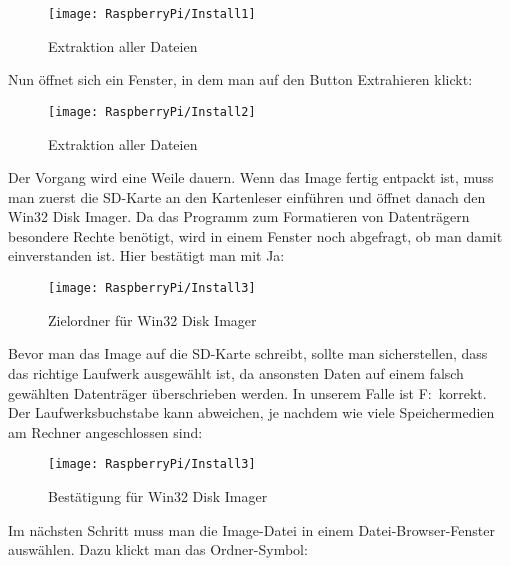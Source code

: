 \begin{figure}[!h]
	\centering

    \texttt{[image: RaspberryPi/Install1]}
	
	\caption{Extraktion aller Dateien}
	
\end{figure}

Nun öffnet sich ein Fenster, in dem man auf den Button Extrahieren klickt:

\begin{figure}[!h]
	\centering
	
 	\texttt{[image: RaspberryPi/Install2]}
	
	\caption{Extraktion aller Dateien}
	
\end{figure}




Der Vorgang wird eine Weile dauern. Wenn das Image fertig entpackt ist, muss man zuerst die SD-Karte an den Kartenleser einführen und öffnet danach den Win32 Disk Imager. Da das Programm zum Formatieren von Datenträgern besondere Rechte benötigt, wird in einem Fenster noch abgefragt, ob man damit einverstanden ist. Hier bestätigt man mit Ja:

\begin{figure}[!h]
	\centering
	
	\texttt{[image: RaspberryPi/Install3]}
	
	\caption{Zielordner für Win32 Disk Imager}
	
\end{figure}

Bevor man das Image auf die SD-Karte schreibt, sollte man sicherstellen, dass das richtige Laufwerk ausgewählt ist, da ansonsten Daten auf einem falsch gewählten Datenträger überschrieben werden. In unserem Falle ist F:\ korrekt. Der Laufwerksbuchstabe kann abweichen, je nachdem wie viele Speichermedien am Rechner angeschlossen sind:


\begin{figure}[!h]
	\centering
	
	\texttt{[image: RaspberryPi/Install3]}
	
	\caption{Bestätigung für Win32 Disk Imager}
	
\end{figure}


Im nächsten Schritt muss man die Image-Datei in einem Datei-Browser-Fenster auswählen. Dazu klickt man das Ordner-Symbol:

